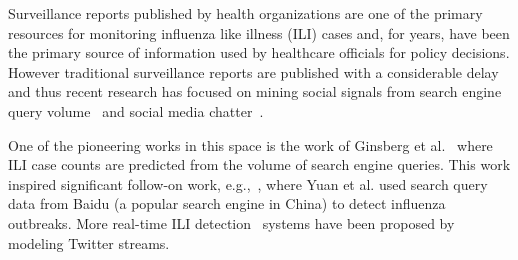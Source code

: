Surveillance reports published by health organizations are one of the
primary resources for monitoring influenza like illness (ILI) cases and,
for years, have been the primary source of information used by healthcare
officials for policy decisions. However traditional surveillance
reports are published with a considerable delay and thus recent research
has focused on mining social signals from 
search engine query volume~\cite{ref1, ref2} and social
media chatter~\cite{ref3, ref4, ref5, ref6, ref7}.




One of the pioneering works in this 
space is the work of
Ginsberg et al.~\cite{ref2} where 
ILI case counts are predicted 
from the volume of search engine queries. This work 
inspired significant follow-on work, e.g.,~\cite{ref1}, where Yuan 
et al. used search query data from Baidu (a popular search 
engine in China) to detect influenza outbreaks. 
More real-time ILI detection~\cite{ref4} systems have been proposed 
by modeling Twitter streams.

